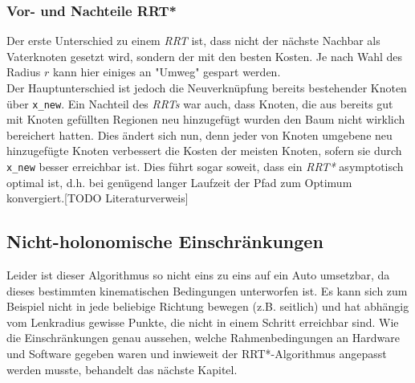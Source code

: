 \subsubsection{Vor- und Nachteile RRT*}
Der erste Unterschied zu einem \textit{RRT} ist, dass nicht der nächste Nachbar als Vaterknoten gesetzt wird, sondern der mit den besten Kosten. Je nach Wahl des Radius $r$ kann hier einiges an "Umweg" gespart werden. \\
Der Hauptunterschied ist jedoch die Neuverknüpfung bereits bestehender Knoten über \verb|x_new|. Ein Nachteil des \textit{RRTs} war auch, dass Knoten, die aus bereits gut mit Knoten gefüllten Regionen neu hinzugefügt wurden den Baum nicht wirklich bereichert hatten. Dies ändert sich nun, denn jeder von Knoten umgebene neu hinzugefügte Knoten verbessert die Kosten der meisten Knoten, sofern sie durch \verb|x_new| besser erreichbar ist. Dies führt sogar soweit, dass ein \textit{RRT*} asymptotisch optimal ist, d.h. bei genügend langer Laufzeit der Pfad zum Optimum konvergiert.[TODO Literaturverweis]
\subsection{Nicht-holonomische Einschränkungen}
Leider ist dieser Algorithmus so nicht eins zu eins auf ein Auto umsetzbar, da dieses bestimmten kinematischen Bedingungen unterworfen ist. Es kann sich zum Beispiel nicht in jede beliebige Richtung bewegen (z.B. seitlich) und hat abhängig vom Lenkradius gewisse Punkte, die nicht in einem Schritt erreichbar sind. Wie die Einschränkungen genau aussehen, welche Rahmenbedingungen an Hardware und Software gegeben waren und inwieweit der RRT*-Algorithmus angepasst werden musste, behandelt das nächste Kapitel.